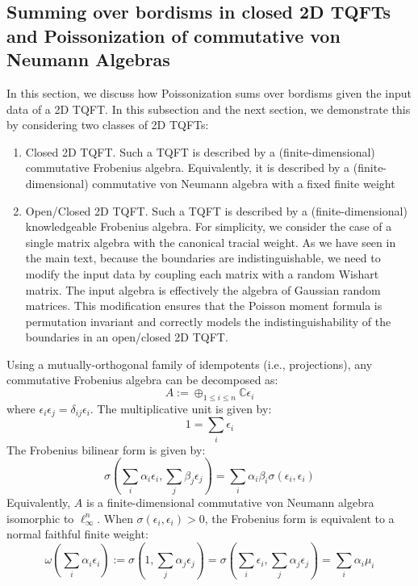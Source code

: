 \documentclass[a4paper,11pt]{article}
\theoremstyle{definition}
\numberwithin{equation}{section}
\begin{document}
\subsection{Summing over bordisms in closed 2D TQFTs and Poissonization of commutative von Neumann Algebras}
In this section, we discuss how Poissonization sums over bordisms given the input data of a 2D TQFT. In this subsection and the next section, we demonstrate this by considering two classes of 2D TQFTs: 
\begin{enumerate}
    \item Closed 2D TQFT. Such a TQFT is described by a (finite-dimensional) commutative Frobenius algebra. Equivalently, it is described by a (finite-dimensional) commutative von Neumann algebra with a fixed finite weight
    \item Open/Closed 2D TQFT. Such a TQFT is described by a (finite-dimensional) knowledgeable Frobenius algebra. For simplicity, we consider the case of a single matrix algebra with the canonical tracial weight. As we have seen in the main text, because the boundaries are indistinguishable, we need to modify the input data by coupling each matrix with a random Wishart matrix. The input algebra is effectively the algebra of Gaussian random matrices. This modification ensures that the Poisson moment formula is permutation invariant and correctly models the indistinguishability of the boundaries in an open/closed 2D TQFT.
\end{enumerate}
Using a mutually-orthogonal family of idempotents (i.e., projections), any commutative Frobenius algebra can be decomposed as:
\begin{equation}
    A := \oplus_{1\leq i \leq n} \mathbb{C}\epsilon_i
\end{equation}
where $\epsilon_i\epsilon_j = \delta_{ij}\epsilon_i$. The multiplicative unit is given by:
\begin{equation}
    1 = \sum_i\epsilon_i
\end{equation}The Frobenius bilinear form is given by:
\begin{equation}
    \sigma(\sum_i\alpha_i\epsilon_i, \sum_j\beta_j\epsilon_j) = \sum_i\alpha_i\beta_i\sigma(\epsilon_i,\epsilon_i)
\end{equation}
Equivalently, $A$ is a finite-dimensional commutative von Neumann algebra isomorphic to $\ell_\infty^n$. When $\sigma(\epsilon_i, \epsilon_i) > 0$, the Frobenius form is equivalent to a normal faithful finite weight:
\begin{equation}
    \omega(\sum_i\alpha_i\epsilon_i) := \sigma(1, \sum_j\alpha_j\epsilon_j) = \sigma(\sum_i\epsilon_i, \sum_j\alpha_j\epsilon_j) = \sum_i\alpha_i\mu_i
\end{equation}
\end{document}
